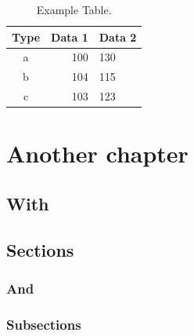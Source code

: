 \documentclass{rptuma}
\begin{document}
\begin{table}
\centering
\begin{tabular}{|c|r|l|}
\hline
Type & Data 1 & Data 2\\
\hline
\hline
a & 100 & 130\\
\hline
b & 104 & 115\\
\hline
c & 103 & 123\\
\hline
\end{tabular}
\caption{Example Table.}
\label{tab:related.table}
\end{table}

\lipsum[4]

\chapter{Another chapter}
\label{chap:another}
\lipsum[5]

\section{With}
\label{sec:anotehr.with}
\lipsum[6]

\section{Sections}
\label{sec:another.section}
\lipsum[7]

\subsection{And}
\label{subsec:another.section.and}
\lipsum[8]

\subsection{Subsections}
\label{subsec:another.section.subsection}
\lipsum[9]



\end{document}
